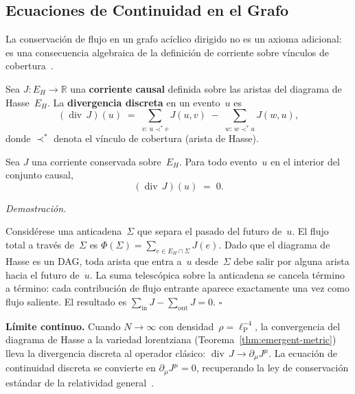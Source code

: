 \documentclass[11pt, a4paper, openany]{book}
\newcommand{\lP}{\ell_{\mathrm{P}}}
\newcommand{\covers}{\prec^{\!*}}
\renewenvironment{proof}[1][Demostraci\'on]{%
  \par\noindent\textit{#1.}\quad
}{\hfill$\square$\par\medskip}
\begin{document}
\subsection{Ecuaciones de Continuidad en el Grafo}
\label{sec:discrete-continuity}

La conservaci\'on de flujo en un grafo ac\'iclico dirigido no es un
axioma adicional: es una consecuencia algebraica de la definici\'on de
corriente sobre v\'inculos de cobertura~\cite{sorkin2012,johnston2009,aslanbeigi2014}.

\begin{definition}
\label{def:discrete-divergence}
Sea $J : E_H \to \mathbb{R}$ una \textbf{corriente causal} definida
sobre las aristas del diagrama de Hasse~$E_H$.  La \textbf{divergencia
discreta} en un evento~$u$ es
\begin{equation}
  (\operatorname{div}\,J)(u)
  \;=\;
  \sum_{v:\, u \covers v} J(u,v)
  \;-\;
  \sum_{w:\, w \covers u} J(w,u),
  \label{eq:discrete-divergence}
\end{equation}
donde $\covers$ denota el v\'inculo de cobertura (arista de Hasse).
\end{definition}

\begin{theorem}
\label{thm:discrete-continuity}
Sea $J$ una corriente conservada sobre~$E_H$.  Para todo evento~$u$
en el interior del conjunto causal,
\[
  (\operatorname{div}\,J)(u) \;=\; 0.
\]
\end{theorem}

\begin{proof}
Consid\'erese una anticadena~$\Sigma$ que separa el pasado del futuro
de~$u$.  El flujo total a trav\'es de~$\Sigma$ es
$\Phi(\Sigma) = \sum_{e \in E_H \cap \Sigma} J(e)$.
Dado que el diagrama de Hasse es un DAG, toda arista que entra a~$u$
desde~$\Sigma$ debe salir por alguna arista hacia el futuro de~$u$.
La suma telesc\'opica sobre la anticadena se cancela t\'ermino a
t\'ermino: cada contribuci\'on de flujo entrante aparece exactamente
una vez como flujo saliente. El resultado es
$\sum_{\text{in}} J - \sum_{\text{out}} J = 0$.
\end{proof}

\medskip\noindent\textbf{L\'imite continuo.}\quad
Cuando $N \to \infty$ con densidad~$\rho = \lP^{-4}$, la convergencia
del diagrama de Hasse a la variedad lorentziana
(Teorema~\ref{thm:emergent-metric}) lleva la divergencia discreta al
operador cl\'asico: $\operatorname{div}\,J \to \partial_\mu J^\mu$.
La ecuaci\'on de continuidad discreta se convierte en
$\partial_\mu J^\mu = 0$, recuperando la ley de conservaci\'on
est\'andar de la relatividad general~\cite{aslanbeigi2014}.
\end{document}
